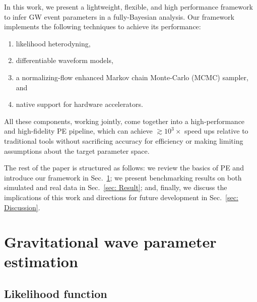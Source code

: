 \documentclass[twocolumn]{aastex631}
\begin{document}
In this work, we present a lightweight, flexible, and high performance
framework to infer GW event parameters in a fully-Bayesian analysis. Our
framework implements the following techniques to achieve its performance:
\begin{enumerate}
\setlength{\itemsep}{0pt}
\item likelihood heterodyning,
\item differentiable waveform models,
\item a normalizing-flow enhanced Markov chain Monte-Carlo (MCMC) sampler, and
\item native support for hardware accelerators.
\end{enumerate}
All these components, working jointly, come together into a high-performance
and high-fidelity PE pipeline, which can achieve ${\gtrsim}10^3\times$ speed
ups relative to traditional tools without sacrificing accuracy for efficiency
or making limiting assumptions about the target parameter space.

The rest of the paper is structured as follows: we review the basics of PE and
introduce our framework in Sec.~\ref{sec: PE}; we present benchmarking results
on both simulated and real data in Sec.~\ref{sec: Result}; and, finally, we
discuss the implications of this work and directions for future development in
Sec.~\ref{sec: Discussion}.

\section{Gravitational wave parameter estimation}
\label{sec: PE}

\subsection{Likelihood function}
\label{sec:likelihood}
\end{document}
